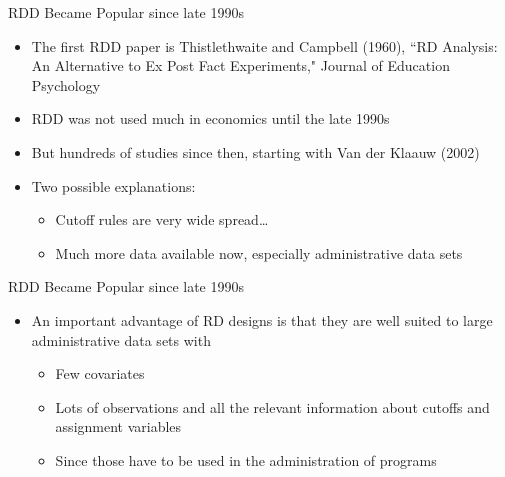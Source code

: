 \documentclass[dvipsnames,hyperref={pdfpagelabels=false}]{beamer}
\begin{document}
\begin{frame}{RDD Became Popular since late 1990s }{}
	
	\begin{itemize}
		\item The first RDD paper is Thistlethwaite and Campbell (1960), ``RD Analysis: An Alternative to Ex Post Fact
		Experiments," Journal of Education Psychology
		\vspace{0.2cm}
		\item RDD was not used much in economics until the late 1990s
		\vspace{0.2cm}
		\item But hundreds of studies since then, starting with Van der Klaauw (2002)
		\vspace{0.2cm}
		\item Two possible explanations:
		\vspace{0.2cm}
		\begin{itemize}
			\item Cutoff rules are very wide spread…
			\vspace{0.2cm}
			\item Much more data available now, especially administrative data sets
		\end{itemize}
		
	\end{itemize}
\end{frame}


\begin{frame}{RDD Became Popular since late 1990s }{}
	
	\begin{itemize}
		\item An important advantage of RD designs is that they are well suited to
		large administrative data sets with
		\vspace{0.2cm}
		\begin{itemize}
			\item Few covariates
			\vspace{0.2cm}
			\item Lots of observations and all the relevant information about cutoffs and assignment variables 
			\vspace{0.2cm}
			\item Since those have to be used in the administration of programs
		\end{itemize}
		
		
	\end{itemize}
\end{frame}
\end{document}
